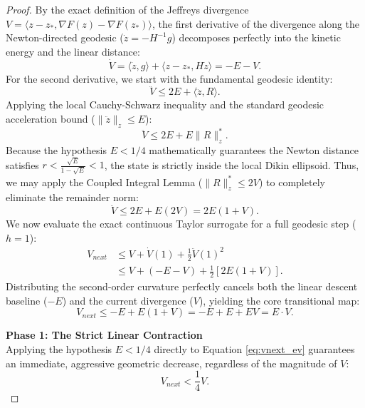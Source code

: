 \begin{proof}
By the exact definition of the Jeffreys divergence $V = \langle z - z_*, \nabla F(z) - \nabla F(z_*) \rangle$, the first derivative of the divergence along the Newton-directed geodesic ($\dot{z} = -H^{-1}g$) decomposes perfectly into the kinetic energy and the linear distance:
\begin{equation}
    \dot{V} = \langle \dot{z}, g \rangle + \langle z - z_*, H\dot{z} \rangle = -E - V.
\end{equation}
For the second derivative, we start with the fundamental geodesic identity:
\begin{equation}
    \ddot{V} \le 2E + \langle \ddot{z}, R \rangle.
\end{equation}
Applying the local Cauchy-Schwarz inequality and the standard geodesic acceleration bound ($\|\ddot{z}\|_z \le E$):
\begin{equation}
    \ddot{V} \le 2E + E\|R\|_z^*.
\end{equation}
Because the hypothesis $E < 1/4$ mathematically guarantees the Newton distance satisfies $r < \frac{\sqrt{E}}{1-\sqrt{E}} < 1$, the state is strictly inside the local Dikin ellipsoid. Thus, we may apply the Coupled Integral Lemma ($\|R\|_z^* \le 2V$) to completely eliminate the remainder norm:
\begin{equation}
    \ddot{V} \le 2E + E(2V) = 2E(1+V).
\end{equation}
We now evaluate the exact continuous Taylor surrogate for a full geodesic step ($h=1$):
\begin{align}
    V_{next} &\le V + \dot{V}(1) + \frac{1}{2}\ddot{V}(1)^2 \\
    &\le V + (-E - V) + \frac{1}{2} \left[ 2E(1+V) \right].
\end{align}
Distributing the second-order curvature perfectly cancels both the linear descent baseline ($-E$) and the current divergence ($V$), yielding the core transitional map:
\begin{equation} \label{eq:vnext_ev}
    V_{next} \le -E + E(1+V) = -E + E + EV = E \cdot V.
\end{equation}

\textbf{Phase 1: The Strict Linear Contraction} \\
Applying the hypothesis $E < 1/4$ directly to Equation \ref{eq:vnext_ev} guarantees an immediate, aggressive geometric decrease, regardless of the magnitude of $V$:
\begin{equation}
    V_{next} < \frac{1}{4} V.
\end{equation}


\end{proof}
